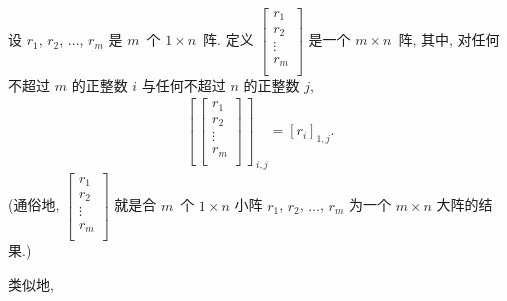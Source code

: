 \documentclass[../libro.tex]{subfiles}
\begin{document}
\begin{definition}
    设 \(r_1\), \(r_2\), \(\dots\), \(r_m\)
    是 \(m\)~个 \(1 \times n\)~阵.
    定义
    \(
        \begin{bmatrix}
            r_1    \\
            r_2    \\
            \vdots \\
            r_m    \\
        \end{bmatrix}
    \)
    是一个 \(m \times n\)~阵,
    其中, 对任何不超过 \(m\) 的正整数 \(i\)
    与任何不超过 \(n\) 的正整数 \(j\),
    \begin{align*}
        \left[\,
            \begin{bmatrix}
                r_1    \\
                r_2    \\
                \vdots \\
                r_m    \\
        \end{bmatrix}\,\right]_{\,i,j}
        = [r_i]_{1,j}.
    \end{align*}
    (通俗地, %
    \(
        \begin{bmatrix}
            r_1    \\
            r_2    \\
            \vdots \\
            r_m    \\
        \end{bmatrix}
    \)
    就是合 \(m\)~个 \(1 \times n\) 小阵
    \(r_1\), \(r_2\), \(\dots\), \(r_m\)
    为一个 \(m \times n\) 大阵的结果.) %
\end{definition}

类似地,
\end{document}
